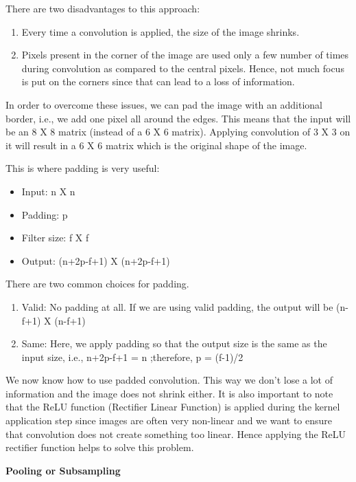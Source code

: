 There are two disadvantages to this approach:

\begin{enumerate}
  \item Every time a convolution is applied, the size of the image shrinks.
  \item Pixels present in the corner of the image are used only a few number of times during convolution as compared to the central pixels. Hence, not much focus is put on the corners since that can lead to a loss of information.
\end{enumerate}

In order to overcome these issues, we can pad the image with an additional border, i.e., we add one pixel all around the edges. This means that the input will be an 8 X 8 matrix (instead of a 6 X 6 matrix). Applying convolution of 3 X 3 on it will result in a 6 X 6 matrix which is the original shape of the image.
\par

This is where padding is very useful:

\begin{itemize}
  \item Input: n X n
  \item Padding: p
  \item Filter size: f X f
  \item Output: (n+2p-f+1) X (n+2p-f+1)
\end{itemize}

There are two common choices for padding.

\begin{enumerate}
  \item Valid: No padding at all. If we are using valid padding, the output will be (n-f+1) X (n-f+1)
  \item Same: Here, we apply padding so that the output size is the same as the input size, i.e., n+2p-f+1 = n ;therefore,  p = (f-1)/2
\end{enumerate}

We now know how to use padded convolution. This way we don’t lose a lot of information and the image does not shrink either. It is also important to note that the ReLU function (Rectifier Linear Function) is applied during the kernel application step since images are often very non-linear and we want to ensure that convolution does not create something too linear. Hence applying the ReLU rectifier function helps to solve this problem.

\begin{flushleft}
  \textbf{Pooling or Subsampling}
\end{flushleft}

